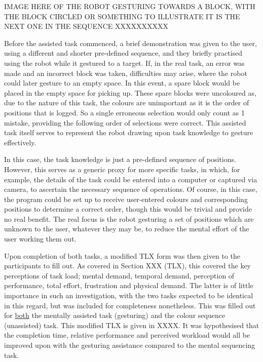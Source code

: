 \documentclass[11pt]{article}
\begin{document}
IMAGE HERE OF THE ROBOT GESTURING TOWARDS A BLOCK, WITH THE BLOCK CIRCLED OR SOMETHING TO ILLUSTRATE IT IS THE NEXT ONE IN THE SEQUENCE XXXXXXXXXX

Before the assisted task commenced, a brief demonstration was given to the user, using a different and shorter pre-defined sequence, and they briefly practised using the robot while it gestured to a target. If, in the real task, an error was made and an incorrect block was taken, difficulties may arise, where the robot could later gesture to an empty space. In this event, a spare block would be placed in the empty space for picking up. These spare blocks were uncoloured as, due to the nature of this task, the colours are unimportant as it is the order of positions that is logged. So a single erroneous selection would only count as 1 mistake, providing the following order of selections were correct. This assisted task itself serves to represent the robot drawing upon task knowledge to gesture effectively. 

In this case, the task knowledge is just a pre-defined sequence of positions. However, this serves as a generic proxy for more specific tasks, in which, for example, the details of the task could be entered into a computer or captured via camera, to ascertain the necessary sequence of operations. Of course, in this case, the program could be set up to receive user-entered colours and corresponding positions to determine a correct order, though this would be trivial and provide no real benefit. The real focus is the robot gesturing a set of positions which are unknown to the user, whatever they may be, to reduce the mental effort of the user working them out.

Upon completion of both tasks, a modified TLX form was then given to the participants to fill out. As covered in Section XXX (TLX), this covered the key perceptions of task load; mental demand, temporal demand, perception of performance, total effort, frustration and physical demand. The latter is of little importance in such an investigation, with the two tasks expected to be identical in this regard, but was included for completeness nonetheless. This was filled out for \underline{both} the mentally assisted task (gesturing) and the colour sequence (unassisted) task. This modified TLX is given in XXXX. It was hypothesised that the completion time, relative performance and perceived workload would all be improved upon with the gesturing assistance compared to the mental sequencing task.


\pagebreak
\end{document}
